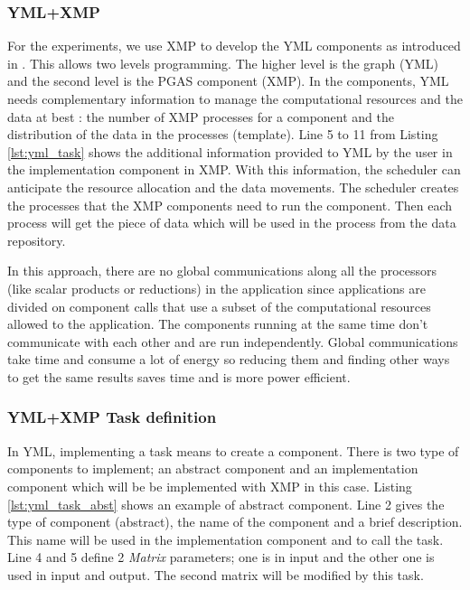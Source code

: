\subsubsection{YML+XMP}
For the experiments, we use XMP to develop the YML components as introduced in \cite{TsSHP2013}.
This allows two levels programming.
The higher level is the graph (YML) and the second level is the PGAS component (XMP).
In the components, YML needs complementary information to manage the computational resources and the data at best : the number of XMP processes for a component and the distribution of the data in the processes (template).
Line 5 to 11 from Listing \ref{lst:yml_task} shows the additional information provided to YML by the user in the implementation component in XMP.
With this information, the scheduler can anticipate the resource allocation and the data movements.
The scheduler creates the processes that the XMP components need to run the component.
Then each process will get the piece of data which will be used in the process from the data repository.



In this approach, there are no global communications along all the processors (like scalar products or reductions) in the application since applications are divided on component calls that use a subset of the computational resources allowed to the application.
The components running at the same time don't communicate with each other and are run independently.
Global communications take time and consume a lot of energy so reducing them and finding other ways to get the same results saves time and is more power efficient.



\subsubsection{YML+XMP Task definition}
In YML, implementing a task means to create a component.
There is two type of components to implement; an abstract component and an implementation component which will be be implemented with XMP in this case.
Listing \ref{lst:yml_task_abst} shows an example of abstract component.
Line 2 gives the type of component (abstract), the name of the component and a brief description.
This name will be used in the implementation component and to call the task.
Line 4 and 5 define 2 \textit{Matrix} parameters; one is in input and the other one is used in input and output.
The second matrix will be modified by this task.

